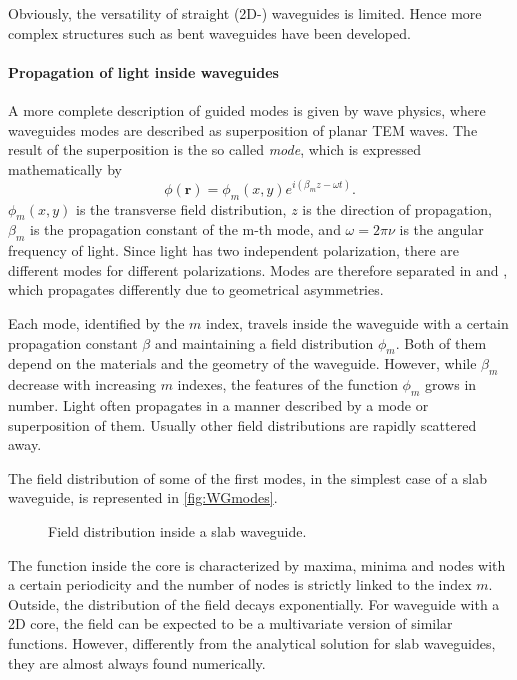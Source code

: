 Obviously, the versatility of straight (2D-) waveguides is limited.
Hence more complex structures such as bent waveguides have been developed.

\paragraph{Propagation of light inside waveguides\\}
\noindent A more complete description of guided modes is given by wave physics, where waveguides modes are described as superposition of planar \ac{TEM} waves.
The result of the superposition is the so called \textit{mode}, which is expressed mathematically by
\begin{equation}
	\phi(\textbf{r}) = \phi_m\left( x, y \right) e^{i\left( \beta_m z - \omega t \right)}.
	\label{eq:mode_propagation}
\end{equation}
$\phi_m\left( x, y \right)$ is the transverse field distribution, $z$ is the direction of propagation, $\beta_m$ is the propagation constant of the m-th mode, and $\omega=2\pi \nu$ is the angular frequency of light.
Since light has two independent polarization, there are different modes for different polarizations.
Modes are therefore separated in  and , which propagates differently due to geometrical asymmetries.

Each mode, identified by the $m$ index, travels inside the waveguide with a certain propagation constant $\beta$ and maintaining a field distribution $\phi_m$.
Both of them depend on the materials and the geometry of the waveguide.
However, while $\beta_m$ decrease with increasing $m$ indexes, the features of the function $\phi_m$ grows in number.
Light often propagates in a manner described by a mode or superposition of them.
Usually other field distributions are rapidly scattered away.%

The field distribution of some of the first modes, in the simplest case of a slab waveguide, is represented in \autoref{fig:WGmodes}.
\begin{figure}[ht]
	\centering
	
	\caption{Field distribution inside a slab waveguide.}
	\label{fig:WGmodes}
\end{figure}
The function inside the core is characterized by maxima, minima and nodes with a certain periodicity and the number of nodes is strictly linked to the index $m$.
Outside, the distribution of the field decays exponentially.
For waveguide with a 2D core, the field can be expected to be a multivariate version of similar functions.
However, differently from the analytical solution for slab waveguides, they are almost always found numerically.

